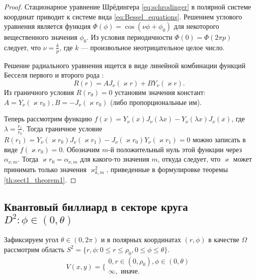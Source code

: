 \begin{proof}
%
Стационарное уравнение Шрёдингера \eqref{eq:schrodinger}   в полярной системе координат приводит к системе вида  \eqref{eq:Bessel_equations}.
Решением углового уравнения  является функция $\Phi(\phi)  = \cos{(\nu \phi + \phi_0)}$ для некоторого вещественного значения $\phi_0$. Из условия периодичности $\Phi(0) = \Phi(2\pi p)$ следует, что 
$\nu = \frac{k}{p}$, где $k$ --- произвольное неотрицательное целое число. 

Решение радиального уравнения ищется в виде линейной  комбинации функций Бесселя первого и второго рода \cite[\S\ 9, с.~358]{wref2}:
$$R(r) = A J_\nu(\varkappa r) +B Y_\nu(\varkappa r).$$
Из граничного условия $R(r_0) = 0$ установим значения констант: $A = Y_\nu(\varkappa r_0), B = -J_\nu(\varkappa r_0)$ (либо пропорциональные им). 

Теперь рассмотрим функцию  $f(x)=Y_\nu(x) J_\nu(\lambda x) - Y_\nu(\lambda x) J_\nu(x)$, где $\lambda = \frac{r_1}{r_0}$.
Тогда граничное условие $R(r_1) = Y_\nu(\varkappa r_0) J_\nu(\varkappa r_1) -J_\nu(\varkappa r_0) Y_\nu(\varkappa r_1) =0$ можно записать в виде
$f(\varkappa r_0)=0$.
Обозначим $m$-й положительный нуль этой функции через $\alpha_{\nu, m}$. Тогда  $\varkappa r_0 = \alpha_{\nu, m} $ для какого-то значения $m$,
откуда следует, что $\varkappa$ может принимать только значения $\varkappa^2_{k,m}$, приведенные в формулировке теоремы \ref{th:sect1_theorem1}.
\end{proof}

\subsection{Квантовый биллиард в секторе круга $D^2: \phi \in (0, \theta)$}\label{sec:ch1/sec2/sec3}
Зафиксируем угол $\theta \in (0, 2\pi)$ и в полярных координатах $(r, \phi)$ в качестве $\Omega$ рассмотрим область 
$S^2 = \{r, \phi : 0 \leq r \leq \rho_0 , 0 \leq \phi \leq \theta\}$.
\[
    V(x, y) = 
    \Bigg\{
    \begin{array}{cc}
        0, r \in (0, \rho_0), \phi \in (0, \theta) \\
        \infty, \text{ иначе}.\\
    \end{array}
\] 

